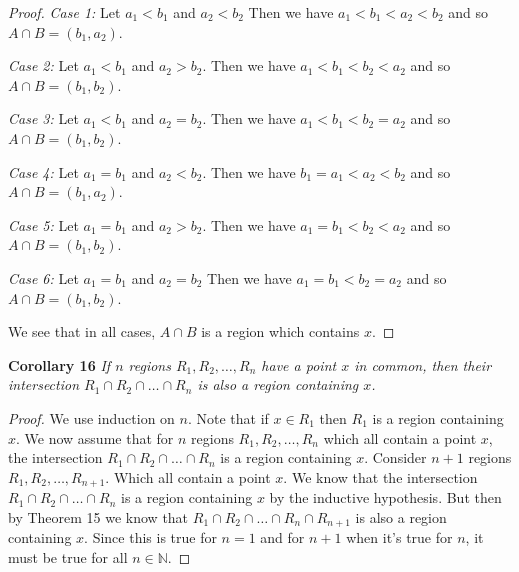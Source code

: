 \documentclass{article}
\begin{document}
\begin{flushleft}
\begin{proof}
\textsl{Case 1:} Let $a_1<b_1$ and $a_2<b_2$ Then we have $a_1<b_1<a_2<b_2$ and so $A \cap B = (b_1,a_2)$.\newline

\textsl{Case 2:} Let $a_1<b_1$ and $a_2>b_2$. Then we have $a_1<b_1<b_2<a_2$ and so $A \cap B = (b_1,b_2)$.\newline

\textsl{Case 3:} Let $a_1<b_1$ and $a_2=b_2$. Then we have $a_1<b_1<b_2=a_2$ and so $A \cap B = (b_1,b_2)$.\newline

\textsl{Case 4:} Let $a_1=b_1$ and $a_2<b_2$. Then we have $b_1=a_1<a_2<b_2$ and so $A \cap B = (b_1,a_2)$.\newline

\textsl{Case 5:} Let $a_1=b_1$ and $a_2>b_2$. Then we have $a_1=b_1<b_2<a_2$ and so $A \cap B = (b_1,b_2)$.\newline

\textsl{Case 6:} Let $a_1=b_1$ and $a_2=b_2$ Then we have $a_1=b_1<b_2=a_2$ and so $A \cap B = (b_1,b_2)$.\newline

We see that in all cases, $A \cap B$ is a region which contains $x$.
\end{proof}

\textbf{Corollary 16}
\textsl{If $n$ regions $R_1,R_2, \dots ,R_n$ have a point $x$ in common, then their intersection $R_1 \cap R_2 \cap \dots \cap R_n$ is also a region containing $x$.}
\begin{proof}
We use induction on $n$. Note that if $x \in R_1$ then $R_1$ is a region containing $x$. We now assume that for $n$ regions $R_1,R_2, \dots ,R_n$ which all contain a point $x$, the intersection $R_1 \cap R_2 \cap \dots \cap R_n$ is a region containing $x$. Consider $n+1$ regions $R_1,R_2, \dots ,R_{n+1}$. Which all contain a point $x$. We know that the intersection $R_1 \cap R_2 \cap \dots \cap R_n$ is a region containing $x$ by the inductive hypothesis. But then by Theorem 15 we know that $R_1 \cap R_2 \cap \dots \cap R_n \cap R_{n+1}$ is also a region containing $x$. Since this is true for $n=1$ and for $n+1$ when it's true for $n$, it must be true for all $n \in \mathbb{N}$.
\end{proof}


\end{flushleft}
\end{document}
